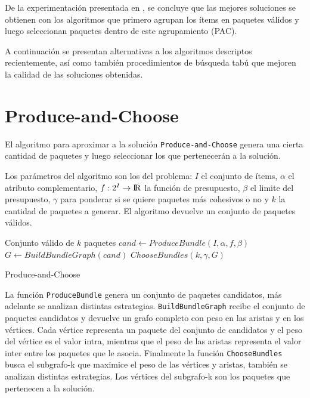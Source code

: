 De la experimentación presentada en \cite{compositeRetrival}, se concluye que las mejores soluciones se obtienen con los algoritmos que primero agrupan los ítems en paquetes válidos y luego seleccionan paquetes dentro de este agrupamiento (PAC). 

A continuación se presentan alternativas a los algoritmos descriptos recientemente, así como también procedimientos de búsqueda tabú que mejoren la calidad de las soluciones obtenidas.

\section{Produce-and-Choose}
El algoritmo para aproximar a la solución \texttt{Produce-and-Choose} genera una cierta cantidad de paquetes y luego seleccionar los que pertenecerán a la solución.

Los parámetros del algoritmo son los del problema: $I$ el conjunto de ítems, $\alpha$ el atributo complementario, $f: 2^{I} \rightarrow \rm I \!R$ la función de presupuesto, $\beta$ el limite del presupuesto, $\gamma$ para ponderar si se quiere paquetes más cohesivos o no y $k$ la cantidad de paquetes a generar. El algoritmo devuelve un conjunto de paquetes válidos.

\begin{algorithm}[H]
\begin{algorithmic}[1]
\ENSURE Conjunto válido de $k$ paquetes
\STATE $cand \leftarrow ProduceBundle(I,\alpha,f,\beta)$
\STATE $G \leftarrow BuildBundleGraph(cand)$
\RETURN $ChooseBundles(k,\gamma,G)$
\end{algorithmic}
\caption{Produce-and-Choose}\label{alg:PAC}
\end{algorithm}

La función \texttt{ProduceBundle} genera un conjunto de paquetes candidatos, más adelante se analizan distintas estrategias. \texttt{BuildBundleGraph} recibe el conjunto de paquetes candidatos y devuelve un grafo completo con peso en las aristas y en los vértices. Cada vértice representa un paquete del conjunto de candidatos y el peso del vértice es el valor intra, mientras que el peso de las aristas representa el valor inter entre los paquetes que le asocia. Finalmente la función \texttt{ChooseBundles} busca el subgrafo-k que maximice el peso de las vértices y aristas, también se analizan distintas estrategias. Los vértices del subgrafo-k son los paquetes que pertenecen a la solución.\\

